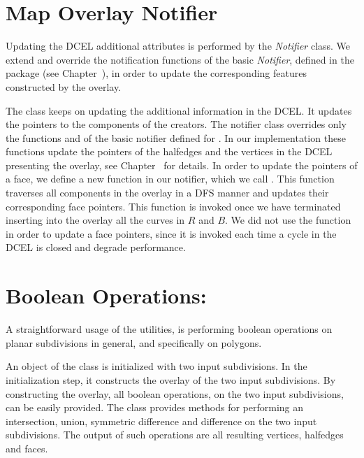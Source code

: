 \begin{ccTexOnly}
\section{Map Overlay Notifier}
\label{sec:notifier}
Updating the DCEL additional attributes is performed by the {\em Notifier} class.
We extend and override the notification functions of the basic {\em Notifier}, 
defined in the  package 
(see Chapter~), 
in order to update the corresponding features constructed by the overlay. 

The  class 
keeps on updating the additional information in the DCEL.
It updates the pointers to the components of the creators.
The notifier class overrides only the functions  
and  of the basic notifier defined for .
In our implementation these functions update 
the pointers of the halfedges and the vertices in the DCEL 
presenting the overlay, see Chapter~ for details.
In order to update the pointers of a face, we define a new function in our 
notifier, which we call . 
This function traverses all components in the overlay in a DFS manner and 
updates their corresponding face pointers. 
This function is invoked once we have terminated 
inserting into the overlay all the curves in $R$ and $B$.
We did not use the  function in order to update a 
face pointers, since it is invoked each time a cycle in the DCEL 
is closed and degrade performance. 

\section{Boolean Operations:}
A straightforward usage of the  
utilities, is performing boolean operations on planar subdivisions in general, 
and specifically on polygons.

An object of the  class is initialized with 
two input subdivisions. In the initialization step, it constructs the overlay 
of the two input subdivisions. By constructing the overlay, all boolean operations, 
on the two input subdivisions, can be easily provided.
The   class provides methods for 
performing an intersection, union, symmetric difference and difference on the two 
input subdivisions. 
The output of such operations are all resulting vertices, halfedges and faces.


\end{ccTexOnly}
